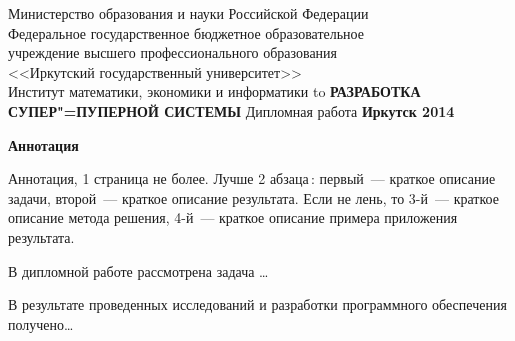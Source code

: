 \documentclass[a4paper,14pt, openany, twoside, draft]{extbook} %
\newcommand{\aaa}[2][acolor]{\noindent\textcolor{eclr}%
{+\ [}\textcolor{#1}{#2}\textcolor{eclr}{]}}
\begin{document}

\renewcommand{\refname}{Список использованных источников} %
\renewcommand{\bibname}{\refname}
\begin{titlepage}
\thispagestyle{empty}
\begin{center}{\small{}
Министерство образования и науки
Российской Федерации \\
Федеральное государственное бюджетное образовательное\\
учреждение высшего профессионального образования\\
<<Иркутский государственный университет>> \\
Институт математики, экономики и информатики
}
\vfill
\hbox to \linewidth{\hfill\bfseries И.~С.~Петров\hfill}
 \vspace{2em}
{\large\bfseries РАЗРАБОТКА СУПЕР"=ПУПЕРНОЙ СИСТЕМЫ} %
\vspace{2em}
{Дипломная работа}
\vfill
\vfill
 \textbf{Иркутск 2014}
\end{center}
\end{titlepage}

\newpage
\thispagestyle{empty}
\begin{center}
  \Large\bfseries Аннотация
\end{center}
Аннотация, 1 страница не более. Лучше 2 абзаца\,: первый~--- краткое описание задачи, второй~--- краткое описание результата.  Если не лень, то 3-й~--- краткое описание метода решения, 4-й~--- краткое описание примера приложения результата.

В дипломной работе рассмотрена задача \ldots{}

В результате проведенных исследований и разработки программного обеспечения получено\ldots{}

\clearpage
\tableofcontents
\clearpage
\end{document}
